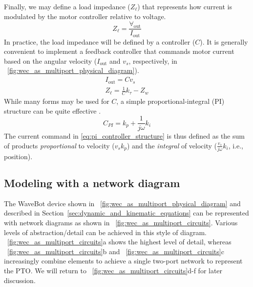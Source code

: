 \documentclass[twocolumn]{autart}
\begin{document}
Finally, we may define a load impedance ($Z_\ell$) that represents how current is modulated by the motor controller relative to voltage.
%
\begin{equation}
        Z_\ell = \frac{\forall_{\textrm{out}}}{I_{\textrm{out}}}
        \label{eq:load_impedance}
\end{equation}
%
In practice, the load impedance will be defined by a controller ($C$).
It is generally convenient to implement a feedback controller that commands motor current based on the angular velocity ($I_{\textrm{out}}$ and $v_s$, respectively, in \figurename~\ref{fig:wec_as_multiport_physical_diagram}).
%
\begin{subequations}
\begin{gather}
        I_{\textrm{out}} = C v_s \\  
        Z_\ell = \frac{1}{C} k_\tau - Z_w     
\end{gather}
\end{subequations}
%
While many forms may be used for $C$, a simple proportional-integral (PI) structure can be quite effective \cite{Coe2020a}.
%
\begin{equation}
        C_{PI} = k_p + \frac{1}{j \omega} k_i 
        \label{eq:pi_controller_structure}
\end{equation}
%
The current command in \eqref{eq:pi_controller_structure} is thus defined as the sum of products \emph{proportional} to velocity ($v_s k_p$) and the \emph{integral} of velocity ($\frac{v_s}{j \omega} k_i$, i.e., position).

\subsection{Modeling with a network diagram}\label{sec:modeling_with_a_network_diagram}

The WaveBot device shown in \figurename~\ref{fig:wec_as_multiport_physical_diagram} and described in Section~\ref{sec:dynamic_and_kinematic_equations} can be represented with network diagrams as shown in \figurename~\ref{fig:wec_as_multiport_circuits}.
Various levels of abstraction/detail can be achieved in this style of diagram.
\figurename~\ref{fig:wec_as_multiport_circuits}a shows the highest level of detail, whereas \figurename~\ref{fig:wec_as_multiport_circuits}b and \figurename~\ref{fig:wec_as_multiport_circuits}c increasingly combine elements to achieve a single two-port network to represent the PTO.
We will return to \figurename~\ref{fig:wec_as_multiport_circuits}d-f for later discussion.
\end{document}
